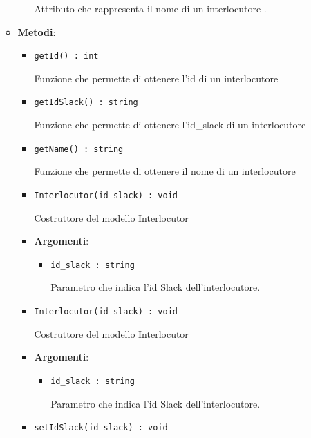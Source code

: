 \documentclass[../DefinizioneDiProdotto.tex]{subfiles}
\begin{document}
\begin{itemize}
\begin{itemize}
\begin{itemize}
	 Attributo che rappresenta il nome di un interlocutore
	.
	\end{itemize}
	\item \textbf{Metodi}:
	\begin{itemize}
	\item \texttt{getId() : int}\

	 Funzione che permette di ottenere l'id di un interlocutore
	\end{itemize}\vspace{0.5em}
	\begin{itemize}
	\item \texttt{getIdSlack() : string}\

	 Funzione che permette di ottenere l'id\_slack di un interlocutore
	\end{itemize}\vspace{0.5em}
	\begin{itemize}
	\item \texttt{getName() : string}\

	 Funzione che permette di ottenere il nome di un interlocutore
	\end{itemize}\vspace{0.5em}
	\begin{itemize}
	\item \texttt{Interlocutor(id\_slack) : void}\

	 Costruttore del modello Interlocutor

	\item \textbf{Argomenti}:
	\begin{itemize}
	\item \texttt{id\_slack : string}\

	 Parametro che indica l'id Slack dell'interlocutore.
	\end{itemize}
	\end{itemize}\vspace{0.5em}
	\begin{itemize}
	\item \texttt{Interlocutor(id\_slack) : void}\

	 Costruttore del modello Interlocutor

	\item \textbf{Argomenti}:
	\begin{itemize}
	\item \texttt{id\_slack : string}\

	 Parametro che indica l'id Slack dell'interlocutore.
	\end{itemize}
	\end{itemize}\vspace{0.5em}
	\begin{itemize}
	\item \texttt{setIdSlack(id\_slack) : void}\


\end{itemize}
\end{itemize}
\end{itemize}
\end{document}
